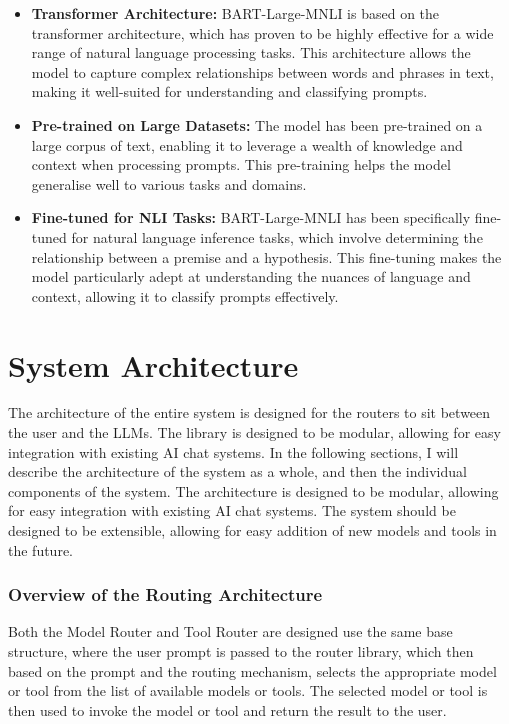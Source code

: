 \begin{itemize}
    \item \textbf{Transformer Architecture:} BART-Large-MNLI is based on the transformer architecture, which has proven to be highly effective for a wide range of natural language processing tasks. This architecture allows the model to capture complex relationships between words and phrases in text, making it well-suited for understanding and classifying prompts.
    \item \textbf{Pre-trained on Large Datasets:} The model has been pre-trained on a large corpus of text, enabling it to leverage a wealth of knowledge and context when processing prompts. This pre-training helps the model generalise well to various tasks and domains.
    \item \textbf{Fine-tuned for NLI Tasks:} BART-Large-MNLI has been specifically fine-tuned for natural language inference tasks, which involve determining the relationship between a premise and a hypothesis. This fine-tuning makes the model particularly adept at understanding the nuances of language and context, allowing it to classify prompts effectively.
\end{itemize}

\newpage
\section{System Architecture}
\label{sec:system_architecture}

The architecture of the entire system is designed for the routers to sit between the user and the LLMs. The library is designed to be modular, allowing for easy integration with existing AI chat systems. In the following sections, I will describe the architecture of the system as a whole, and then the individual components of the system. The architecture is designed to be modular, allowing for easy integration with existing AI chat systems. The system should be designed to be extensible, allowing for easy addition of new models and tools in the future.


\subsubsection{Overview of the Routing Architecture}

Both the Model Router and Tool Router are designed use the same base structure, where the user prompt is passed to the router library, which then based on the prompt and the routing mechanism, selects the appropriate model or tool from the list of available models or tools. The selected model or tool is then used to invoke the model or tool and return the result to the user. 

